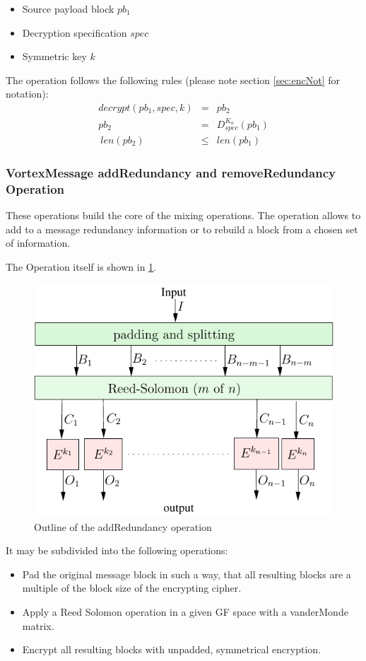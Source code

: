 \begin{itemize}
	\item Source payload block $pb_1$
	\item Decryption specification $spec$
	\item Symmetric key $k$
\end{itemize}

The operation follows the following rules (please note section \ref{sec:encNot} for notation):
\begin{eqnarray}
decrypt(pb_1, spec, k) & = & pb_2 \\
pb_2 & = & D_{spec}^{K_a}\left( pb_1 \right)\\\
len(pb_2) & \leq & len(pb_1)
\end{eqnarray}

\subsubsection{VortexMessage addRedundancy and removeRedundancy Operation}
These operations build the core of the mixing operations. The operation allows to add to a message redundancy information or to rebuild a block from a chosen set of information. 

The Operation itself is shown in \ref{fig:addRedundancyOperation}. 
\begin{figure}[ht]
	\includegraphics[width=\columnwidth]{inc/addRedundancyOp}
	\caption{Outline of the addRedundancy operation}
	\label{fig:addRedundancyOperation}
\end{figure}
It may be subdivided into the following operations:
\begin{itemize}
	\item Pad the original message block in such a way, that all resulting blocks are a multiple of the block size of the encrypting cipher.
	\item Apply a Reed Solomon operation in a given GF space with a vanderMonde matrix.
	\item Encrypt all resulting blocks with unpadded, symmetrical encryption.
\end{itemize}


